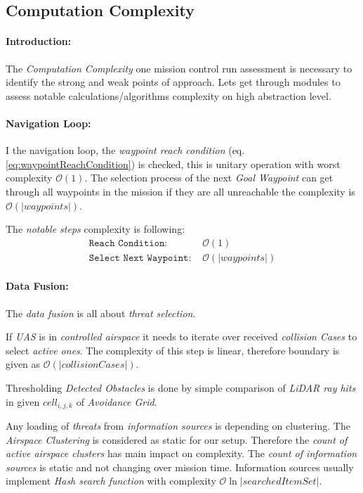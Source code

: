 \newpage
\subsection{Computation Complexity}\label{sec:MCRcomputationalComplexity}
\paragraph{Introduction:}The \emph{Computation Complexity} one mission control run assessment is necessary to identify the strong and weak points of approach. Lets get through modules to assess notable calculations/algorithms complexity on high abstraction level.

\paragraph{Navigation Loop:} I the navigation loop, the \emph{waypoint reach condition} (eq. \ref{eq:waypointReachCondition}) is checked, this is unitary operation with worst complexity $\mathscr{O}(1)$. The selection process of the next \emph{Goal Waypoint} can get through all waypoints in the mission if they are all unreachable the complexity is $\mathscr{O}(|waypoints|)$.

The \emph{notable steps} complexity is following:
\begin{equation*}
    \begin{aligned}
        \texttt{Reach Condition: }& \mathscr{O}(1)\\
        \texttt{Select Next Waypoint: }&\mathscr{O}(|waypoints|)
    \end{aligned}
\end{equation*}

\paragraph{Data Fusion:} The \emph{data fusion} is all about \emph{threat selection}. 

If \emph{UAS} is in \emph{controlled airspace} it needs to iterate over received \emph{collision Cases} to select \emph{active ones}. The complexity of this step is linear, therefore boundary is given as $\mathscr{O} (|collision Cases|)$.

Thresholding \emph{Detected Obstacles} is done by simple comparison of \emph{LiDAR ray hits} in given $cell_{i,j,k}$ of \emph{Avoidance Grid}.

Any loading of \emph{threats} from \emph{information sources} is depending on clustering. The \emph{Airspace Clustering} is considered as static for our setup. Therefore the \emph{count of active airspace clusters} has main impact on complexity. The \emph{count of information sources} is static and not changing over mission time. Information sources usually implement \emph{Hash search function} with complexity $\mathscr{O}\ln|searched Item Set|$.

